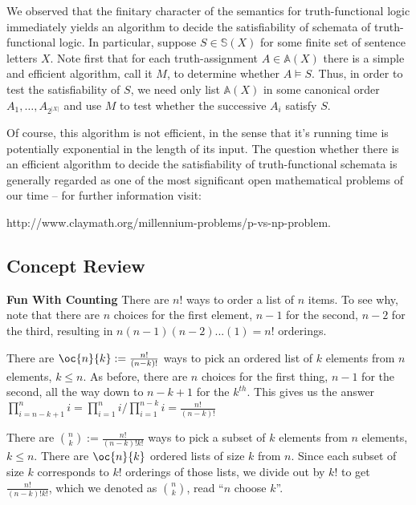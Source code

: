 We observed that the finitary character of the semantics for truth-functional logic immediately yields an algorithm to decide the satisfiability of schemata of truth-functional logic. In particular, suppose $S\in\mathbb{S}(X)$ for some finite set of sentence letters $X$. Note first that for each truth-assignment $A\in\mathbb{A}(X)$ there is a simple and efficient algorithm, call it $M$, to determine whether $A\models S$. Thus, in order to test the satisfiability of $S$, we need only list $\mathbb{A}(X)$ in some canonical order $A_1,\ldots, A_{2^{|X|}}$ and use $M$ to test whether the successive $A_i$ satisfy $S$. 


Of course, this algorithm is not efficient, in the sense that it's running time is potentially exponential in the length of its input. The question whether there is an efficient algorithm to decide the satisfiability of truth-functional schemata is generally regarded as one of the most significant open mathematical problems of our time -- for further information visit: 

http://www.claymath.org/millennium-problems/p-vs-np-problem.

\newpage
\begin{mdframed}[linewidth=1]
\section*{Concept Review}
\textbf{Fun With Counting}
There are $n!$ ways to order a list of $n$ items. To see why, note that there are $n$ choices for the first element, $n - 1$ for the second, $n - 2$ for the third, resulting in $n(n - 1)(n - 2)...(1) = n!$ orderings. 

There are $\oc{n}{k} := \frac{n!}{(n-k)!}$ ways to pick an ordered list of $k$ elements from $n$ elements, $k \leq n$. As before, there are $n$ choices for the first thing, $n-1$ for the second, all the way down to $n-k+1$ for the $k^{th}$. This gives us the answer $\prod_{i = n - k + 1}^ni = \prod_{i = 1}^ni / \prod_{i = 1}^{n - k}i = \frac{n!}{(n-k)!}$   

There are ${n \choose k} := \frac{n!}{(n-k)!k!}$ ways to pick a subset of $k$ elements from $n$ elements, $k \leq n$. There are $\oc{n}{k}$ ordered lists of size $k$ from $n$. Since each subset of size $k$ corresponds to $k!$ orderings of those lists, we divide out by $k!$ to get $\frac{n!}{(n-k)!k!}$, which we denoted as $n \choose k$, read ``$n$ choose $k$''. 

\end{mdframed}

